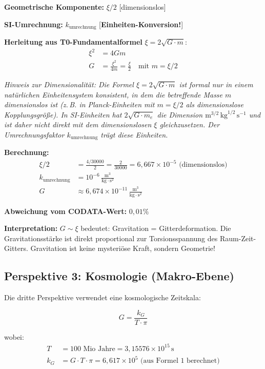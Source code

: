 	\textbf{Geometrische Komponente:} \(\xi/2\) [dimensionslos]
	
	\textbf{SI-Umrechnung:} \(k_{\text{umrechnung}}\) [\textbf{Einheiten-Konversion!}]
	
	\textbf{Herleitung aus T0-Fundamentalformel} \(\xi = 2\sqrt{G \cdot m}\):
	\begin{align}
		\xi^2 &= 4Gm \\
		G &= \frac{\xi^2}{4m} = \frac{\xi}{2} \quad \text{mit } m = \xi/2
	\end{align}
	
	\textit{Hinweis zur Dimensionalität: Die Formel $\xi = 2\sqrt{G \cdot m}$ ist formal nur in einem natürlichen Einheitensystem konsistent, in dem die betreffende Masse $m$ dimensionslos ist (z.\,B. in Planck-Einheiten mit $m = \xi/2$ als dimensionslose Kopplungsgröße). In SI-Einheiten hat $2\sqrt{G \cdot m_e}$ die Dimension $\text{m}^{3/2}\,\text{kg}^{1/2}\,\text{s}^{-1}$ und ist daher nicht direkt mit dem dimensionslosen $\xi$ gleichzusetzen. Der Umrechnungsfaktor $k_{\text{umrechnung}}$ trägt diese Einheiten.}
	
	\textbf{Berechnung:}
	\begin{align}
		\xi/2 &= \frac{4/30000}{2} = \frac{2}{30000} = 6{,}667 \times 10^{-5} \text{ (dimensionslos)} \\
		k_{\text{umrechnung}} &= 10^{-6}\,\frac{\text{m}^3}{\text{kg} \cdot \text{s}^2} \\
		G &\approx 6{,}674 \times 10^{-11}\,\frac{\text{m}^3}{\text{kg} \cdot \text{s}^2}
	\end{align}
	
	\textbf{Abweichung vom CODATA-Wert:} \(0{,}01\%\)
	
	\textbf{Interpretation:} \(G \sim \xi\) bedeutet: Gravitation = Gitterdeformation. Die Gravitationsstärke ist direkt proportional zur Torsionsspannung des Raum-Zeit-Gitters. Gravitation ist keine mysteriöse Kraft, sondern Geometrie!
	
	\subsection{Perspektive 3: Kosmologie (Makro-Ebene)}
	
	Die dritte Perspektive verwendet eine kosmologische Zeitskala:
	
	\begin{equation}
		\boxed{G = \frac{k_G}{T \cdot \pi}}
	\end{equation}
	
	wobei:
	\begin{align}
		T &= 100 \text{ Mio Jahre} = 3{,}15576 \times 10^{15}\,\text{s} \\
		k_G &= G \cdot T \cdot \pi = 6{,}617 \times 10^5 \text{ (aus Formel 1 berechnet)}
	\end{align}
	
